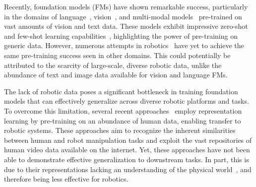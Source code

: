 
Recently, foundation models (FMs) have shown remarkable success, particularly in the domains of language~\cite{neurips2020gpt3,Touvron2023LLaMAOA}, vision~\cite{Kirillov_2023_ICCV}, and multi-modal models~\cite{chen2022pali,Alayrac2022FlamingoAV,liu2023llava,li2023blip2,OpenAI2023GPT4TR} pre-trained on vast amounts of vision and text data. These models exhibit impressive zero-shot and few-shot learning capabilities~\cite{radford2021clip,InstructGPT_ouyang2022training,wei2021finetuned,chung2024scaling}, highlighting the power of pre-training on generic data. However, numerous attempts in robotics~\cite{Xiao2022mvp,kimOpenVLAOpenSourceVisionLanguageAction2024,zhen_3d-vla_2024,niuLLARVAVisionActionInstruction2024,lapa} have yet to achieve the same pre-training success seen in other domains. This could potentially be attributed to the scarcity of large-scale, diverse robotic data, unlike the abundance of text and image data available for vision and language FMs. 





The lack of robotic data poses a significant bottleneck in training foundation models that can effectively generalize across diverse robotic platforms and tasks. To overcome this limitation, several recent approaches~\cite{Xiao2022mvp,lapa} employ representation learning by pre-training on an abundance of human data, enabling transfer to robotic systems. These approaches aim to recognize the inherent similarities between human and robot manipulation tasks and exploit the vast repositories of human video data available on the internet. Yet, these approaches have not been able to demonstrate effective generalization to downstream tasks. In part, this is due to their representations lacking an understanding of the physical world~\cite{zhen3DVLA3DVisionLanguageAction2024}, and therefore being less effective for robotics.

